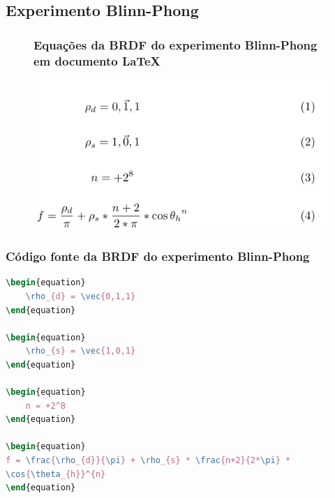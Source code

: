 \subsection{Experimento Blinn-Phong}

\begin{frame}
\begin{figure}
    \frametitle{Equações da BRDF do experimento Blinn-Phong em documento \LaTeX{}}
    \begin{center}
        \includegraphics[scale=0.92]{./Imagens/brdfs/blinn-phong.pdf}
    \end{center}
\end{figure}
\end{frame}



\begin{frame}[fragile]
    \frametitle{Código fonte da BRDF do experimento Blinn-Phong}
\begin{lstlisting}[language=tex, frame=none, inputencoding=utf8]
\begin{equation}
    \rho_{d} = \vec{0,1,1}
\end{equation}

\begin{equation}
    \rho_{s} = \vec{1,0,1}
\end{equation}

\begin{equation}
    n = +2^8
\end{equation}

\begin{equation}
f = \frac{\rho_{d}}{\pi} + \rho_{s} * \frac{n+2}{2*\pi} *
\cos{\theta_{h}}^{n}
\end{equation}
\end{lstlisting}
\end{frame}

